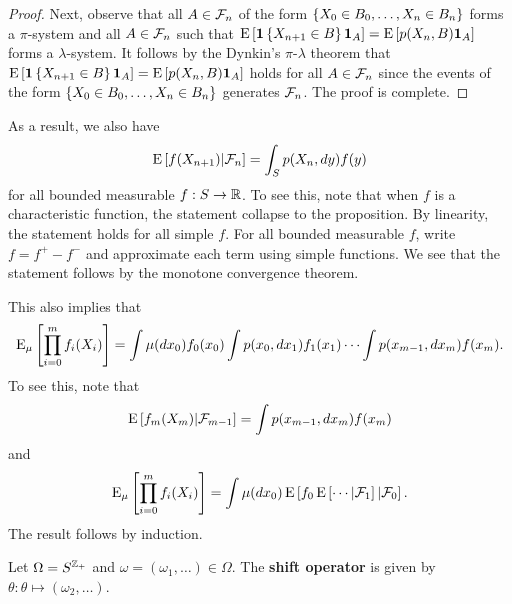 \begin{proof}
    Next, observe that all $A\in\mathcal{F}_n$ of the form $\left\{ {X_0\in B_0,\ldots,X_n\in B_n} \right\}$  
    forms a $\pi$-system and all $A\in\mathcal{F}_n$ such that $\operatorname{E}\left[ {\mathbf{1}\left\{ {X_{n+1}\in B} \right\}\mathbf{1}_A} \right] = \operatorname{E}\left[ {p(X_n, B)\mathbf{1}_A} \right]$ 
    forms a $\lambda$-system. It follows by the Dynkin's $\pi$-$\lambda$ theorem 
    that $\operatorname{E}\left[ {\mathbf{1}\left\{ {X_{n+1}\in B} \right\}\mathbf{1}_A} \right] = \operatorname{E}\left[ {p(X_n, B)\mathbf{1}_A} \right]$ holds 
    for all $A\in\mathcal{F}_n$ since the events of the form $\left\{ {X_0\in B_0,\ldots,X_n\in B_n} \right\}$ 
    generates $\mathcal{F}_n$. The proof is complete. 
\end{proof}
\begin{remark}
    As a result, we also have 
    \begin{equation*}
        \operatorname{E}\left[ {f(X_{n+1})|\mathcal{F}_n} \right] = \int_S p(X_n, dy)f(y)
    \end{equation*}
    for all bounded measurable $f:S\to\mathbb{R}$. To see this, note that when $f$ is 
    a characteristic function, the statement collapse to the proposition. 
    By linearity, the statement holds for all simple $f$. For all bounded 
    measurable $f$, write $f = f^+ - f^-$ and approximate each term using 
    simple functions. We see that the statement follows by the monotone 
    convergence theorem. 
\end{remark}
\begin{remark}
    This also implies that 
    \begin{equation*}
        \operatorname{E}_\mu\left[ {\prod_{i=0}^mf_i(X_i)} \right] = \int \mu(dx_0)f_0(x_0)\int p(x_0,dx_1)f_1(x_1)\cdots\int p(x_{m-1},dx_m)f(x_m).
    \end{equation*}
    To see this, note that 
    \begin{equation*}
        \operatorname{E}\left[ {f_m(X_m)|\mathcal{F}_{m-1}} \right] = \int p(x_{m-1},dx_m)f(x_m)
    \end{equation*}
    and 
    \begin{equation*}
        \operatorname{E}_\mu\left[ {\prod_{i=0}^mf_i(X_i)} \right] = \int \mu(dx_0)\operatorname{E}\left[ {f_0\operatorname{E}\left[ {\cdots|\mathcal{F}_1} \right]|\mathcal{F}_0} \right].
    \end{equation*}
    The result follows by induction. 
\end{remark}

\begin{definition}
    Let $\Omega = S^{\mathbb{Z}_+}$ and $\omega = (\omega_1,\ldots)\in\Omega$. The \textbf{shift operator} 
    is given by $\theta:\theta\mapsto(\omega_2,\ldots)$. 
\end{definition}

